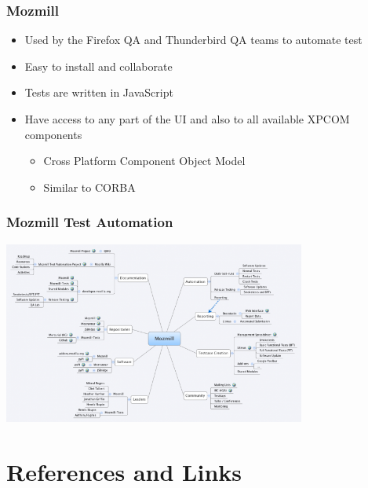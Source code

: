 \documentclass{beamer}
\begin{document}

\begin{frame}
\frametitle{Mozmill}
 \begin{itemize}
  \item Used by the Firefox QA and Thunderbird QA teams to automate test
  \item Easy to install and collaborate
  \item Tests are written in JavaScript
  \item Have access to any part of the UI and also to all available XPCOM components
      \begin{itemize}
      \item Cross Platform Component Object Model
      \item Similar to CORBA
      \end{itemize}
 \end{itemize}
\end{frame}


\begin{frame}
\frametitle{Mozmill Test Automation}
\begin{center}
 \includegraphics[height=6cm]{figs/Mozmill_Test_Automation_Map.png}
\begin{figure}
\end{figure}
\end{center}
\end{frame}


\section{References and Links}
\end{document}
